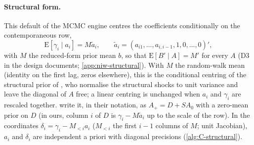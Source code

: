 \paragraph{Structural form.} This default of the MCMC engine centres the coefficients
conditionally on the contemporaneous row,
\begin{equation}\label{eq:centring}
  \mathrm{E}[\gamma_i \mid a_i] = M\tilde a_i, \qquad
  \tilde a_i = (a_{i1}, \dots, a_{i,i-1}, 1, 0, \dots, 0)',
\end{equation}
with $M$ the reduced-form prior mean $b$, so that $\mathrm{E}[B' \mid A] = M'$ for every $A$ (D3 in
the design documents; \cref{app:niw-structural}). With $M$ the random-walk mean (identity on the
first lag, zeros elsewhere), this is the conditional centring of the structural prior of
\citet{sims1998bayesian}, who normalise the structural shocks to unit variance and leave the
diagonal of $A$ free; a linear centring is unchanged when $a_i$ and $\gamma_i$ are rescaled
together. \citet{sims2006were} write it, in their notation, as $A_+ = D + SA_0$ with a zero-mean
prior on $D$ (in ours, column $i$ of $D$ is $\gamma_i - M\tilde a_i$ up to the scale of the row).
In the coordinates $\delta_i = \gamma_i - M_{<i}a_i$ ($M_{<i}$ the first $i-1$ columns of $M$;
unit Jacobian), $a_i$ and $\delta_i$ are independent a priori with diagonal precisions
(\cref{alg:C-structural}). %

